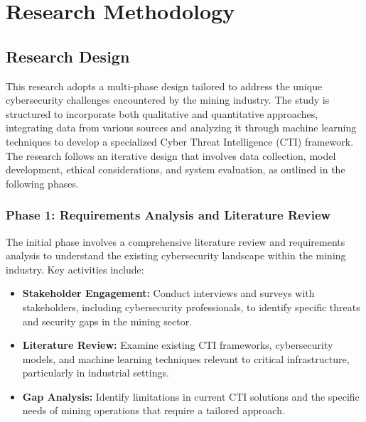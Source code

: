 \documentclass[a4paper,twoside,12pt]{report}
\begin{document}
\chapter{Research Methodology}

\section{Research Design}

This research adopts a multi-phase design tailored to address the unique cybersecurity challenges encountered by the mining industry. The study is structured to incorporate both qualitative and quantitative approaches, integrating data from various sources and analyzing it through machine learning techniques to develop a specialized Cyber Threat Intelligence (CTI) framework. The research follows an iterative design that involves data collection, model development, ethical considerations, and system evaluation, as outlined in the following phases.

\subsection{Phase 1: Requirements Analysis and Literature Review}
The initial phase involves a comprehensive literature review and requirements analysis to understand the existing cybersecurity landscape within the mining industry. Key activities include:
\begin{itemize}
    \item \textbf{Stakeholder Engagement:} Conduct interviews and surveys with stakeholders, including cybersecurity professionals, to identify specific threats and security gaps in the mining sector.
    \item \textbf{Literature Review:} Examine existing CTI frameworks, cybersecurity models, and machine learning techniques relevant to critical infrastructure, particularly in industrial settings.
    \item \textbf{Gap Analysis:} Identify limitations in current CTI solutions and the specific needs of mining operations that require a tailored approach.
\end{itemize}
\end{document}
